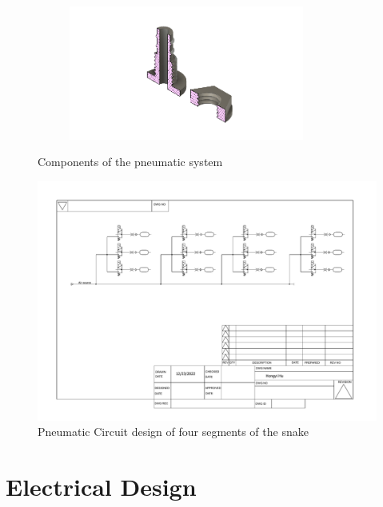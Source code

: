 \documentclass[twoside, 11pt]{article}
\begin{document}
\begin{figure}[H]
\begin{subfigure}[t]{0.25\linewidth}
	\end{subfigure}%
	\begin{subfigure}[t]{0.25\linewidth}
		\centering
		\includegraphics[width=0.85\textwidth]{valve_section}
	\end{subfigure}%
	\caption{Components of the pneumatic system}
\end{figure}

\begin{figure} [H]
	\centering
	\includegraphics[width=0.75\linewidth]{pneumatic circuit design}
	\caption{Pneumatic Circuit design of four segments of the snake}
\end{figure}

\section{Electrical Design}
\end{document}
